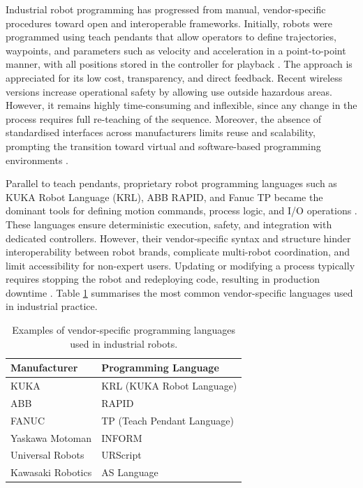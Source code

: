 
Industrial robot programming has progressed from manual, vendor-specific procedures toward open and interoperable frameworks. Initially, robots were programmed using teach pendants that allow operators to define trajectories, waypoints, and parameters such as velocity and acceleration in a point-to-point manner, with all positions stored in the controller for playback \cite{teachpendant}. The approach is appreciated for its low cost, transparency, and direct feedback. Recent wireless versions increase operational safety by allowing use outside hazardous areas. However, it remains highly time-consuming and inflexible, since any change in the process requires full re-teaching of the sequence. Moreover, the absence of standardised interfaces across manufacturers limits reuse and scalability, prompting the transition toward virtual and software-based programming environments \cite{teachpendant}.


Parallel to teach pendants, proprietary robot programming languages such as KUKA Robot Language (KRL), ABB RAPID, and Fanuc TP became the dominant tools for defining motion commands, process logic, and I/O operations \cite{app13042582}. These languages ensure deterministic execution, safety, and integration with dedicated controllers. However, their vendor-specific syntax and structure hinder interoperability between robot brands, complicate multi-robot coordination, and limit accessibility for non-expert users. Updating or modifying a process typically requires stopping the robot and redeploying code, resulting in production downtime \cite{app13042582}. Table \ref{tab:vendor_lang} summarises the most common vendor-specific languages used in industrial practice.

\begin{table}[H]
\centering
\begin{tabular}{l|l}
\textbf{Manufacturer} & \textbf{Programming Language} \\ \hline
KUKA                & KRL (KUKA Robot Language)      \\
ABB                 & RAPID                          \\
FANUC               & TP (Teach Pendant Language)    \\
Yaskawa Motoman     & INFORM                         \\
Universal Robots    & URScript                       \\
Kawasaki Robotics   & AS Language                    \\

\end{tabular}
\caption{Examples of vendor-specific programming languages used in industrial robots.}
\label{tab:vendor_lang}
\end{table}

